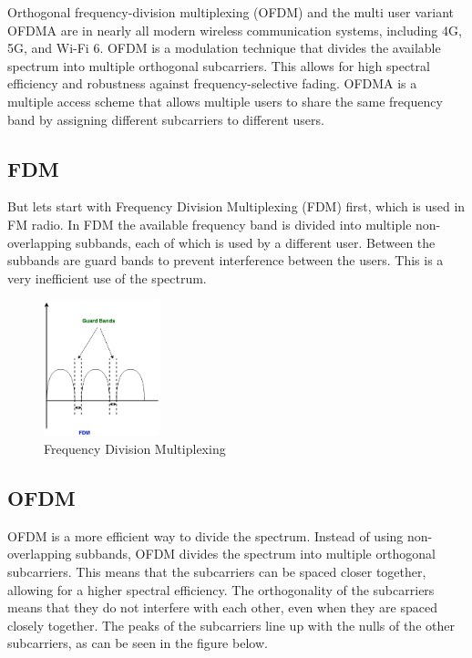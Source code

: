 Orthogonal frequency-division multiplexing (OFDM) and the multi user variant OFDMA are in nearly all modern wireless communication systems, including 4G, 5G, and Wi-Fi 6. OFDM is a modulation technique that divides the available spectrum into multiple orthogonal subcarriers. This allows for high spectral efficiency and robustness against frequency-selective fading. OFDMA is a multiple access scheme that allows multiple users to share the same frequency band by assigning different subcarriers to different users.

\subsection{FDM}

But lets start with Frequency Division Multiplexing (FDM) first, which is used in FM radio. In FDM the available frequency band is divided into multiple non-overlapping subbands, each of which is used by a different user. Between the subbands are guard bands to prevent interference between the users. This is a very inefficient use of the spectrum.

\begin{figure}[H]
	\centering
	\includegraphics[width=0.3\textwidth]{Figures/fdm.png}
	\caption{Frequency Division Multiplexing}
\end{figure}

\subsection{OFDM}

OFDM is a more efficient way to divide the spectrum. Instead of using non-overlapping subbands, OFDM divides the spectrum into multiple orthogonal subcarriers. This means that the subcarriers can be spaced closer together, allowing for a higher spectral efficiency. The orthogonality of the subcarriers means that they do not interfere with each other, even when they are spaced closely together. The peaks of the subcarriers line up with the nulls of the other subcarriers, as can be seen in the figure below.

